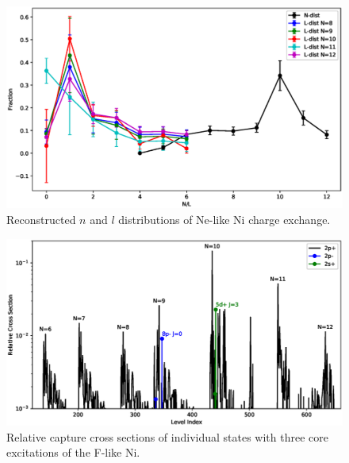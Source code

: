 \documentclass{aastex}
\begin{document}
\begin{figure}
  \includegraphics[width=5in]{nk_ni_h2.eps}
  \caption{\label{fig:ni+h2.nldist}Reconstructed $n$ and $l$ distributions of
    Ne-like Ni charge exchange.}
\end{figure}

\begin{figure}
  \includegraphics[width=5in]{icx_ni_h2.eps}
  \caption{\label{fig:ni+h2.icx}Relative capture cross sections of individual
    states with three core excitations of the F-like Ni.}
\end{figure}
\end{document}
